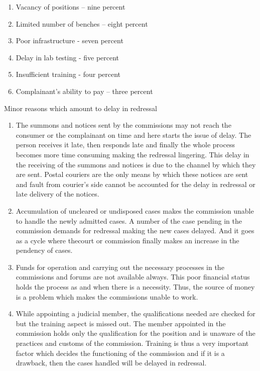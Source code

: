 \begin{multicols}{2}
\begin{enumerate}[label=$\bullet$]
\item Vacancy of positions – nine percent

\item Limited number of benches – eight percent

\item Poor infrastructure - seven percent

\item Delay in lab testing - five percent

\item Insufficient training - four percent

\item Complainant’s ability to pay – three percent
\end{enumerate}

\noi
Minor reasons which amount to delay in redressal

\begin{enumerate}[label=$\bullet$]
\item The summons and notices sent by the commissions may not reach the consumer or the
complainant on time and here starts the issue of delay. The person receives it late, then
responds late and finally the whole process becomes more time consuming making the
redressal lingering. This delay in the receiving of the summons and notices is due to the
channel by which they are sent. Postal couriers are the only means by which these
notices are sent and fault from courier’s side cannot be accounted for the delay in
redressal or late delivery of the notices.

\item Accumulation of uncleared or undisposed cases makes the commission unable to handle
the newly admitted cases. A number of the case pending in the commission demands
for redressal making the new cases delayed. And it goes as a cycle where thecourt or
commission finally makes an increase in the pendency of cases.

\item Funds for operation and carrying out the necessary processes in the commissions and
forums are not available always. This poor financial status holds the process as and
when there is a necessity. Thus, the source of money is a problem which makes the
commissions unable to work.

\item While appointing a judicial member, the qualifications needed are checked for but the
training aspect is missed out. The member appointed in the commission holds only the
qualification for the position and is unaware of the practices and customs of the
commission. Training is thus a very important factor which decides the functioning of
the commission and if it is a drawback, then the cases handled will be delayed in
redressal.


\end{enumerate}
\end{multicols}
